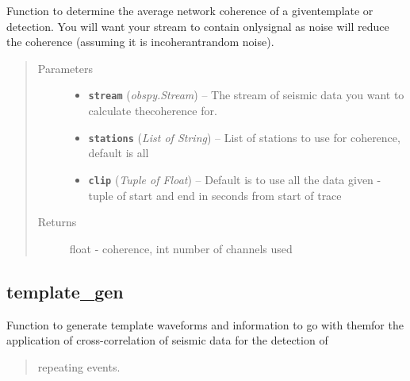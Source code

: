 \documentclass[a4paper,10pt,english]{sphinxmanual}
\begin{document}

\begin{fulllineitems}
\label{submodules/core.bright_lights:bright_lights.coherence}
Function to determine the average network coherence of a giventemplate or detection.  You will want your stream to contain onlysignal as noise will reduce the coherence (assuming it is incoherantrandom noise).
\begin{quote}\begin{description}
\item[{Parameters}] \leavevmode\begin{itemize}
\item {} 
\textbf{\texttt{stream}} (\emph{obspy.Stream}) -- The stream of seismic data you want to calculate thecoherence for.

\item {} 
\textbf{\texttt{stations}} (\emph{List of String}) -- List of stations to use for coherence, default is all

\item {} 
\textbf{\texttt{clip}} (\emph{Tuple of Float}) -- Default is to use all the data given - tuple of start and end in seconds from start of trace

\end{itemize}

\item[{Returns}] \leavevmode
float - coherence, int number of channels used

\end{description}\end{quote}

\end{fulllineitems}



\subsection{template\_gen}
\label{submodules/core.template_gen:template-gen}\label{submodules/core.template_gen::doc}\label{submodules/core.template_gen:module-template_gen}
Function to generate template waveforms and information to go with themfor the application of cross-correlation of seismic data for the detection of
\begin{quote}

repeating events.
\end{quote}
\end{document}
